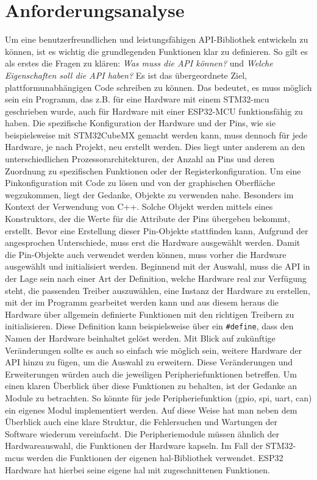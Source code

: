 \section{Anforderungsanalyse}
Um eine benutzerfreundlichen und leistungsfähigen API-Bibliothek entwickeln zu können, ist es wichtig die grundlegenden Funktionen klar zu definieren.
So gilt es als erstes die Fragen zu klären: \emph{Was muss die API können?} und \emph{Welche Eigenschaften soll die API haben?}
Es ist das übergeordnete Ziel, plattformunabhängigen Code schreiben zu können.
Das bedeutet, es muss möglich sein ein Programm, das z.B. für eine Hardware mit einem STM32-\gls{mcu} geschrieben wurde, auch für Hardware mit einer ESP32-MCU funktionsfähig zu haben.
Die spezifische Konfiguration der Hardware und der Pins, wie sie beispielsweise mit STM32CubeMX gemacht werden kann, muss dennoch für jede Hardware, je nach Projekt, neu erstellt werden.
Dies liegt unter anderem an den unterschiedlichen Prozessorarchitekturen, der Anzahl an Pins und deren Zuordnung zu spezifischen Funktionen oder der Registerkonfiguration.
Um eine Pinkonfiguration mit Code zu lösen und von der graphischen Oberfläche wegzukommen, liegt der Gedanke, Objekte zu verwenden nahe.
Besonders im Kontext der Verwendung von C++.
Solche Objekt werden mittels eines Konstruktors, der die Werte für die Attribute der Pins übergeben bekommt, erstellt.
Bevor eine Erstellung dieser Pin-Objekte stattfinden kann, Aufgrund der angesprochen Unterschiede, muss erst die Hardware ausgewählt werden.
Damit die Pin-Objekte auch verwendet werden können, muss vorher die Hardware ausgewählt und initialisiert werden.
Beginnend mit der Auswahl, muss die API in der Lage sein nach einer Art der Definition, welche Hardware real zur Verfügung steht, die passenden Treiber auszuwählen, eine Instanz der Hardware zu erstellen, mit der im Programm gearbeitet werden kann und aus diesem heraus die Hardware über allgemein definierte Funktionen mit den richtigen Treibern zu initialisieren.
Diese Definition kann beispielsweise über ein \texttt{\#define}, dass den Namen der Hardware beinhaltet gelöst werden.
Mit Blick auf zukünftige Veränderungen sollte es auch so einfach wie möglich sein, weitere Hardware der API hinzu zu fügen, um die Auswahl zu erweitern.
Diese Veränderungen und Erweiterungen würden auch die jeweiligen Peripheriefunktionen betreffen.
Um einen klaren Überblick über diese Funktionen zu behalten, ist der Gedanke an Module zu betrachten.
So könnte für jede Peripheriefunktion (\gls{gpio}, \gls{spi}, \gls{uart}, \gls{can}) ein eigenes Modul implementiert werden.
Auf diese Weise hat man neben dem Überblick auch eine klare Struktur, die Fehlersuchen und Wartungen der Software wiederum vereinfacht.
Die Peripheriemodule müssen ähnlich der Hardwareauswahl, die Funktionen der Hardware kapseln.
Im Fall der STM32-\gls{mcu}s werden die Funktionen der eigenen \gls{hal}-Bibliothek verwendet.
ESP32 Hardware hat hierbei seine eigene \gls{hal} mit zugeschnittenen Funktionen.

